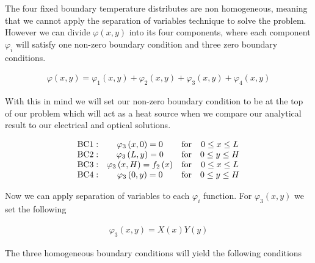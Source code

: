 The four fixed boundary temperature distributes are non homogeneous, meaning that we cannot apply the  separation of variables technique to solve the problem. However we can divide $\varphi \left(x,y \right)$ into its four components, where each component $\varphi_i$ will satisfy one non-zero boundary condition and three zero boundary conditions. 

\begin{equation}\label{eq:supplementalFourComponents}
\begin{split}
\varphi \left( x , y \right) = \varphi _ { 1 } \left( x , y \right) + \varphi _ { 2 } ( x , y ) + \varphi _ { 3 } \left( x , y \right) + \varphi _ { 4 } \left( x , y \right)
\end{split}
\end{equation}

With this in mind we will set our non-zero boundary condition to be at the top of our problem which will act as a heat source when we compare our analytical result to our electrical and optical solutions.


\begin{equation}\label{eq:supplementalOneNonZero}
\begin{array} {c c c c} 
{ \mathrm { BC1 } : } & { \varphi _ { 3 } \left( x , 0 \right) = 0 } & { \mathrm { for } } & { 0 \leq x \leq L} \\ 
{ \mathrm { BC2 } : } & { \varphi _ { 3 } \left( L , y \right) = 0 } & { \mathrm { for } } & { 0 \leq y \leq H} \\ 
{ \mathrm { BC3 } : } & { \varphi _ { 3 } \left( x , H \right) = f _ { 2 } \left( x \right) } & { \mathrm { for } } & { 0 \leq x \leq L} \\ 
{ \mathrm { BC4 } : } & { \varphi _ { 3 } \left( 0 , y \right) = 0 } & { \mathrm { for } } & { 0 \leq y \leq H} 
\end{array}
\end{equation}

Now we can apply separation of variables to each $\varphi_i$ function. For $\varphi_3 \left(x,y \right)$ we set the following

\begin{equation}\label{eq:supplementalSov}
\begin{split}
\varphi _ { 3 } \left( x , y \right) = X \left( x \right) Y \left( y \right)
\end{split}
\end{equation}

The three homogeneous boundary conditions will yield the following conditions 

